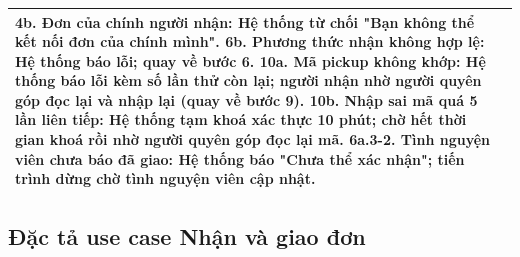 \documentclass[../main.tex]{subfiles}%
\begin{document}
\begin{longtable}{|p{3.5cm}|p{11.5cm}|}
4b. Đơn của chính người nhận: Hệ thống từ chối "Bạn không thể kết nối đơn của chính mình". \newline
6b. Phương thức nhận không hợp lệ: Hệ thống báo lỗi; quay về bước 6. \newline
10a. Mã pickup không khớp: Hệ thống báo lỗi kèm số lần thử còn lại; người nhận nhờ người quyên góp đọc lại và nhập lại (quay về bước 9). \newline
10b. Nhập sai mã quá 5 lần liên tiếp: Hệ thống tạm khoá xác thực 10 phút; chờ hết thời gian khoá rồi nhờ người quyên góp đọc lại mã. \newline
6a.3-2. Tình nguyện viên chưa báo đã giao: Hệ thống báo "Chưa thể xác nhận"; tiến trình dừng chờ tình nguyện viên cập nhật. \\ \hline
\end{longtable}
\endgroup

\subsection{ Đặc tả use case Nhận và giao đơn}
\label{section:2.4.3}
\end{document}
